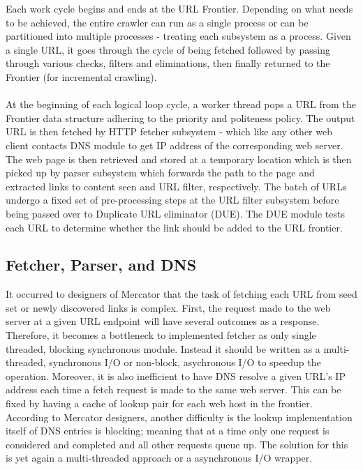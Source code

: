 \noindent
Each work cycle begins and ends at the URL Frontier. Depending on what needs to be
achieved, the entire crawler can run as a single process or can be partitioned into multiple processes - treating each subsystem as a process. Given a single URL, it
goes through the cycle of being fetched followed by passing through various checks,
filters and eliminations, then finally returned to the Frontier (for incremental crawling).
\\
\\
At the beginning of each logical loop cycle, a worker thread pops a URL from the Frontier data structure adhering to the priority and politeness policy. The output URL is then fetched by HTTP fetcher subsystem - which like any other web client contacts DNS module to get IP address of the corresponding web server. The web page is then retrieved and stored at a temporary location which is then picked up by parser subsystem which forwards the path to the page and extracted links to content seen and URL filter, respectively. The batch of URLs undergo a fixed set of pre-processing steps at the URL filter subsystem before being passed over to Duplicate URL eliminator (DUE). The DUE module tests each URL to determine whether the link should be added to the
URL frontier.

\pagebreak

\subsection{Fetcher, Parser, and DNS}
It occurred to designers of Mercator that the task of fetching each URL from seed set or newly discovered
links is complex. First, the request made to the web server at a given URL endpoint will have several outcomes as a response. Therefore, it becomes a bottleneck to implemented fetcher as only single threaded, blocking synchronous module. Instead it should be written as a multi-threaded, synchronous I/O or non-block,
asychronous I/O to speedup the operation. Moreover, it is also inefficient to have DNS resolve a given URL's
IP address each time a fetch request is made to the same web server. This can be fixed by having a cache of
lookup pair for each web host in the frontier. According to Mercator designers, another difficulty is the lookup implementation itself of DNS entries is blocking; meaning that at a time only one request is considered and completed and all other requests queue up. The solution for this is yet again a multi-threaded approach
or a asynchronous I/O wrapper.

